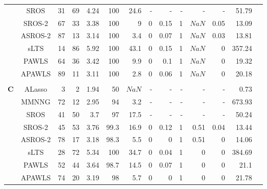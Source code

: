 \documentclass{article}\usepackage[]{graphicx}\usepackage[]{color}
\begin{document}
\begin{table}[thp]
\begin{center}
\begin{tabular}{ccrrrrrrrrrrrr}
	      & SROS & 31 & 69 & 4.24 & 
	      100 & 24.6 & - & - & - & - & - & 51.79\\
	      
	      & SROS-2 & 67 & 33 & 3.38 & 
	      100 & 9 &
	      0 & 0.15 & 1
	      & \ensuremath{NaN} & 0.05 & 13.09\\
	      
	     & ASROS-2 & 87 & 13 & 3.14 & 
	      100 & 3.4 &
	      0 & 0.07 & 1
	      & \ensuremath{NaN} & 0.03 & 13.81\\
	      
	       & sLTS & 14 & 86 & 5.92 & 
	      100 & 43.1 &
	      0 & 0.15 & 1
	      & \ensuremath{NaN} & 0 & 357.24\\
	      
	      & PAWLS & 64 & 36 & 3.42 & 
	      100 & 9.9 &
	      0 & 0.1 & 1
	      & \ensuremath{NaN} & 0 & 19.32\\
	      
	      & APAWLS & 89 & 11 & 3.11 & 
	      100 & 2.8 &
	      0 & 0.06 & 1
	      & \ensuremath{NaN} & 0 & 20.18\\
	      \\
	        	  \multirow{8}{*}{{\bf C}}
	      & ALasso & 3 & 2 & 1.94 & 
	      50 & \ensuremath{NaN} & - & - & - & - & - & 0.73\\
	
	      & MMNNG & 72 & 12 & 2.95 & 
	      94 & 3.2 & - & - & - & - & - & 673.93\\
	      
	      & SROS & 41 & 50 & 3.7 & 
	      97 & 17.5 & - & - & - & - & - & 50.24\\
	      
	      & SROS-2 & 45 & 53 & 3.76 & 
	      99.3 & 16.9 &
	      0 & 0.12 & 1
	      & 0.51 & 0.04 & 13.44\\
	      
	     & ASROS-2 & 78 & 17 & 3.18 & 
	      98.3 & 5.5 &
	      0 & 0 & 1
	      & 0.51 & 0 & 14.06\\
	      
	       & sLTS & 28 & 72 & 5.34 & 
	      100 & 34.7 &
	      0 & 0.04 & 1
	      & 0 & 0 & 384.69\\
	      
	      & PAWLS & 52 & 44 & 3.64 & 
	      98.7 & 14.5 &
	      0 & 0.07 & 1
	      & 0 & 0 & 21.1\\
	      
	      & APAWLS & 74 & 20 & 3.19 & 
	      98 & 5.7 &
	      0 & 0 & 1
	      & 0 & 0 & 21.78\\
	      

\end{tabular}
\end{center}
\end{table}
\end{document}

